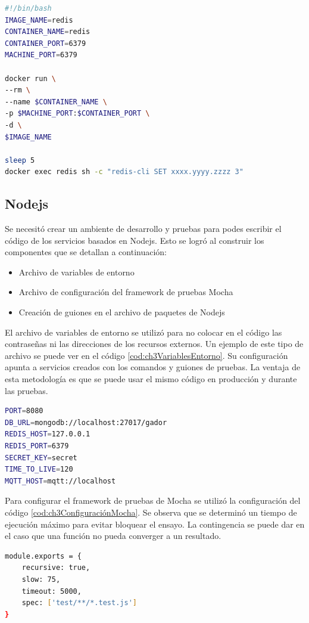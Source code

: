 \begin{lstlisting}[language=bash,label=cod:ch3GuionRedis,caption=Guión de Redis.]
#!/bin/bash
IMAGE_NAME=redis
CONTAINER_NAME=redis
CONTAINER_PORT=6379
MACHINE_PORT=6379

docker run \
--rm \
--name $CONTAINER_NAME \
-p $MACHINE_PORT:$CONTAINER_PORT \
-d \
$IMAGE_NAME

sleep 5
docker exec redis sh -c "redis-cli SET xxxx.yyyy.zzzz 3"
\end{lstlisting}

\subsection{Nodejs}
Se necesitó crear un ambiente de desarrollo y pruebas para podes escribir el código de los servicios basados en Nodejs.
Esto se logró al construir los componentes que se detallan a continuación:
\begin{itemize}
	\item Archivo de variables de entorno
	\item Archivo de configuración del framework de pruebas Mocha
	\item Creación de guiones en el archivo de paquetes de Nodejs
\end{itemize}

El archivo de variables de entorno se utilizó para no colocar en el código las contraseñas ni las direcciones de los recursos externos.
Un ejemplo de este tipo de archivo se puede ver en el código \ref{cod:ch3VariablesEntorno}.
Su configuración apunta a servicios creados con los comandos y guiones de pruebas.
La ventaja de esta metodología es que se puede usar el mismo código en producción y durante las pruebas.

\begin{lstlisting}[language=bash,label=cod:ch3VariablesEntorno,caption=Archivo de variables de entorno.]
PORT=8080
DB_URL=mongodb://localhost:27017/gador
REDIS_HOST=127.0.0.1
REDIS_PORT=6379
SECRET_KEY=secret
TIME_TO_LIVE=120
MQTT_HOST=mqtt://localhost
\end{lstlisting}

Para configurar el framework de pruebas de Mocha se utilizó la configuración del código \ref{cod:ch3ConfiguraciónMocha}.
Se observa que se determinó un tiempo de ejecución máximo para evitar bloquear el ensayo.
La contingencia se puede dar en el caso que una función no pueda converger a un resultado.

\begin{lstlisting}[language=bash,label=cod:ch3ConfiguraciónMocha,caption=Configuración de Mocha.]
module.exports = {
    recursive: true,
    slow: 75,
    timeout: 5000,
    spec: ['test/**/*.test.js']
}
\end{lstlisting}

